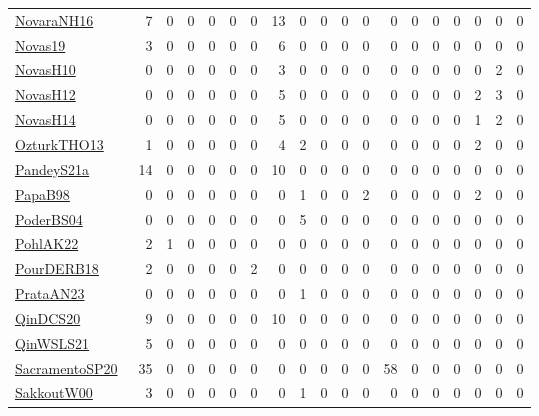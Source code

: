 {\begin{longtable}{l*{18}{r}}
\href{articles/NovaraNH16.pdf}{NovaraNH16}~\cite{NovaraNH16} & 7 & 0 & 0 & 0 & 0 & 0 & 13 & 0 & 0 & 0 & 0 & 0 & 0 & 0 & 0 & 0 & 0 & 0\\
\href{articles/Novas19.pdf}{Novas19}~\cite{Novas19} & 3 & 0 & 0 & 0 & 0 & 0 & 6 & 0 & 0 & 0 & 0 & 0 & 0 & 0 & 0 & 0 & 0 & 0\\
\href{articles/NovasH10.pdf}{NovasH10}~\cite{NovasH10} & 0 & 0 & 0 & 0 & 0 & 0 & 3 & 0 & 0 & 0 & 0 & 0 & 0 & 0 & 0 & 0 & 2 & 0\\
\href{articles/NovasH12.pdf}{NovasH12}~\cite{NovasH12} & 0 & 0 & 0 & 0 & 0 & 0 & 5 & 0 & 0 & 0 & 0 & 0 & 0 & 0 & 0 & 2 & 3 & 0\\
\href{articles/NovasH14.pdf}{NovasH14}~\cite{NovasH14} & 0 & 0 & 0 & 0 & 0 & 0 & 5 & 0 & 0 & 0 & 0 & 0 & 0 & 0 & 0 & 1 & 2 & 0\\
\href{articles/OzturkTHO13.pdf}{OzturkTHO13}~\cite{OzturkTHO13} & 1 & 0 & 0 & 0 & 0 & 0 & 4 & 2 & 0 & 0 & 0 & 0 & 0 & 0 & 0 & 2 & 0 & 0\\
\href{articles/PandeyS21a.pdf}{PandeyS21a}~\cite{PandeyS21a} & 14 & 0 & 0 & 0 & 0 & 0 & 10 & 0 & 0 & 0 & 0 & 0 & 0 & 0 & 0 & 0 & 0 & 0\\
\href{articles/PapaB98.pdf}{PapaB98}~\cite{PapaB98} & 0 & 0 & 0 & 0 & 0 & 0 & 0 & 1 & 0 & 0 & 2 & 0 & 0 & 0 & 0 & 2 & 0 & 0\\
\href{articles/PoderBS04.pdf}{PoderBS04}~\cite{PoderBS04} & 0 & 0 & 0 & 0 & 0 & 0 & 0 & 5 & 0 & 0 & 0 & 0 & 0 & 0 & 0 & 0 & 0 & 0\\
\href{articles/PohlAK22.pdf}{PohlAK22}~\cite{PohlAK22} & 2 & 1 & 0 & 0 & 0 & 0 & 0 & 0 & 0 & 0 & 0 & 0 & 0 & 0 & 0 & 0 & 0 & 0\\
\href{articles/PourDERB18.pdf}{PourDERB18}~\cite{PourDERB18} & 2 & 0 & 0 & 0 & 0 & 2 & 0 & 0 & 0 & 0 & 0 & 0 & 0 & 0 & 0 & 0 & 0 & 0\\
\href{articles/PrataAN23.pdf}{PrataAN23}~\cite{PrataAN23} & 0 & 0 & 0 & 0 & 0 & 0 & 0 & 1 & 0 & 0 & 0 & 0 & 0 & 0 & 0 & 0 & 0 & 0\\
\href{articles/QinDCS20.pdf}{QinDCS20}~\cite{QinDCS20} & 9 & 0 & 0 & 0 & 0 & 0 & 10 & 0 & 0 & 0 & 0 & 0 & 0 & 0 & 0 & 0 & 0 & 0\\
\href{articles/QinWSLS21.pdf}{QinWSLS21}~\cite{QinWSLS21} & 5 & 0 & 0 & 0 & 0 & 0 & 0 & 0 & 0 & 0 & 0 & 0 & 0 & 0 & 0 & 0 & 0 & 0\\
\href{articles/SacramentoSP20.pdf}{SacramentoSP20}~\cite{SacramentoSP20} & 35 & 0 & 0 & 0 & 0 & 0 & 0 & 0 & 0 & 0 & 0 & 58 & 0 & 0 & 0 & 0 & 0 & 0\\
\href{articles/SakkoutW00.pdf}{SakkoutW00}~\cite{SakkoutW00} & 3 & 0 & 0 & 0 & 0 & 0 & 0 & 1 & 0 & 0 & 0 & 0 & 0 & 0 & 0 & 0 & 0 & 0\\

\end{longtable}}
